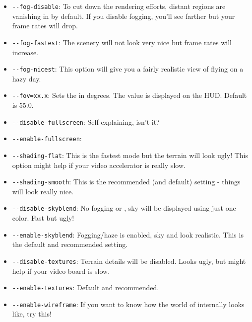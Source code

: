 \begin{itemize}

\item{\texttt{-$\!$-fog-disable}}: To cut down the rendering efforts, distant
  regions are vanishing in  by default. If you disable fogging,
  you'll see farther but your frame rates will drop.

\item{\texttt{-$\!$-fog-fastest}}: The scenery will not look very nice but
  frame rates will increase.

\item{\texttt{-$\!$-fog-nicest}}: This option will give you a fairly realistic
  view of flying on a hazy day.

\item{\texttt{-$\!$-fov=xx.x}}: Sets the  in degrees.
The value is displayed on the HUD. Default is 55.0.

\item{\texttt{-$\!$-disable-fullscreen}}: Self explaining, isn't it?

\item{\texttt{-$\!$-enable-fullscreen}}:

\item{\texttt{-$\!$-shading-flat}}: This is the fastest mode but the terrain will look ugly! This option might help if your video accelerator is really slow.

\item{\texttt{-$\!$-shading-smooth}}: This is the recommended (and default) setting - things will look really nice.

\item{\texttt{-$\!$-disable-skyblend}}: No fogging or , sky will be displayed
  using just one color. Fast but ugly!

\item{\texttt{-$\!$-enable-skyblend}}: Fogging/haze is enabled, sky and  look realistic. This is the default and recommended setting.

\item{\texttt{-$\!$-disable-textures}}: Terrain details will be disabled. Looks ugly, but might help if your video board is slow.

\item{\texttt{-$\!$-enable-textures}}: Default and recommended.

\item{\texttt{-$\!$-enable-wireframe}}: If you want to know how the world of \FlightGear internally looks like, try this!

\end{itemize}

